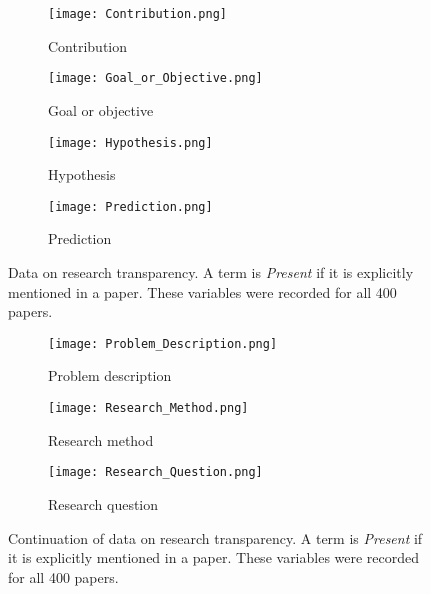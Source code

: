 \begin{figure}[!htb]
\begin{center}
    \begin{subfigure}[b]{0.45\textwidth}
        \texttt{[image: Contribution.png]}
        \caption{Contribution}
        \label{fig:contribution}
    \end{subfigure}
    \begin{subfigure}[b]{0.45\textwidth}
        \texttt{[image: Goal\_or\_Objective.png]}
        \caption{Goal or objective}
        \label{fig:goal_or_objective}
    \end{subfigure}
    \begin{subfigure}[b]{0.45\textwidth}
        \texttt{[image: Hypothesis.png]}
        \caption{Hypothesis}
        \label{fig:hypothesis}
    \end{subfigure}
    \begin{subfigure}[b]{0.45\textwidth}
        \texttt{[image: Prediction.png]}
        \caption{Prediction}
        \label{fig:prediction}
    \end{subfigure}
    \caption[Research transparency data.]{Data on research transparency. A term is \emph{Present} if it is explicitly mentioned in a paper. These variables were recorded for all 400 papers.}
    \label{fig:transparency-data-a}
\end{center}
\end{figure}
\begin{figure}[!htb]
\begin{center}
    \begin{subfigure}[b]{0.4\textwidth}
        \texttt{[image: Problem\_Description.png]}
        \caption{Problem description}
        \label{fig:problem_description}
    \end{subfigure}
    \begin{subfigure}[b]{0.4\textwidth}
        \texttt{[image: Research\_Method.png]}
        \caption{Research method}
        \label{fig:research_method}
    \end{subfigure}
    \begin{subfigure}[b]{0.4\textwidth}
        \texttt{[image: Research\_Question.png]}
        \caption{Research question}
        \label{fig:research_question}
    \end{subfigure}
    \caption[Research transparency data continued.]{Continuation of data on research transparency. A term is \emph{Present} if it is explicitly mentioned in a paper. These variables were recorded for all 400 papers.}
    \label{fig:transparency-data-b}
\end{center}
\end{figure}

